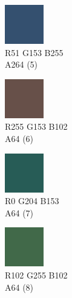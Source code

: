 \begin{figure}[!h]
\begin{subfigure}{0.105\textwidth}
	\end{subfigure}
	\begin{subfigure}{0.105\textwidth}\centering
		\includegraphics[frame]{gui-imgs/R51G153B255A64}
		\vspace*{-20px} \caption*{\hspace*{-0.25px}\tiny R51 G153 B255 \\ \tiny A264 (5)}
	\end{subfigure}
	\begin{subfigure}{0.105\textwidth}\centering
		\includegraphics[frame]{gui-imgs/R255G153B102A64}
		\vspace*{-20px} \caption*{\hspace*{-0.25px}\tiny R255 G153 B102 \\ \tiny A64 (6)}
	\end{subfigure}
	\begin{subfigure}{0.105\textwidth}\centering
		\includegraphics[frame]{gui-imgs/R0G204B153A64}
		\vspace*{-20px} \caption*{\hspace*{-0.25px}\tiny R0 G204 B153 \\ \tiny A64 (7)}
	\end{subfigure}
	\begin{subfigure}{0.105\textwidth}\centering
		\includegraphics[frame]{gui-imgs/R102G255B102A64}
		\vspace*{-20px} \caption*{\hspace*{-0.25px}\tiny R102 G255 B102 \\ \tiny A64 (8)}
	\end{subfigure}
	\begin{subfigure}{0.105\textwidth}\centering

\end{subfigure}
\end{figure}
